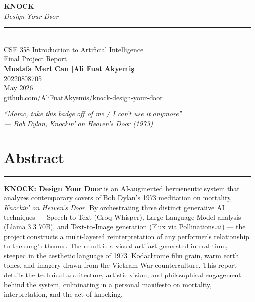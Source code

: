 \documentclass[12pt, a4paper]{article}
\begin{document}
\begin{titlepage}
    \centering
    \vspace*{3cm}

    {\Huge\bfseries\color{darkblue} KNOCK}\\[0.4em]
    {\large\itshape\color{rust} Design Your Door}\\[0.8em]
    \textcolor{gold}{\rule{\linewidth}{0.5pt}}\\[0.8em]
    {\small\color{midgray} CSE 358 Introduction to Artificial Intelligence}\\[0.2em]
    {\small\color{midgray} Final Project Report}\\[3cm]

    {\large\bfseries\color{darkblue} Mustafa Mert Can \quad|\quad Ali Fuat Akyemiş}\\[0.4em]
    {\small\color{midgray} 20220808705 \quad|}\\[0.6em]
    {\small\color{midgray} May 2026}\\[0.6em]
    {\small\ttfamily\color{rust}
        \href{https://github.com/AliFuatAkyemis/knock-design-your-door}%
             {github.com/AliFuatAkyemis/knock-design-your-door}}

    \vfill

    \begin{quotebox}
        \centering
        \itshape\color{rust}
        ``Mama, take this badge off of me / I can't use it anymore''\\[0.3em]
        \normalfont\small\color{midgray}
        --- Bob Dylan, \textit{Knockin' on Heaven's Door} (1973)
    \end{quotebox}
\end{titlepage}

\thispagestyle{empty}
\newpage

\section*{Abstract}
\textcolor{gold}{\rule{\linewidth}{0.5pt}}
\vspace{4pt}

\textbf{KNOCK: Design Your Door} is an AI-augmented hermeneutic system that analyzes
contemporary covers of Bob Dylan's 1973 meditation on mortality,
\textit{Knockin' on Heaven's Door.} By orchestrating three distinct generative AI
techniques --- Speech-to-Text (Groq Whisper), Large Language Model analysis
(Llama 3.3 70B), and Text-to-Image generation (Flux via Pollinations.ai) --- the
project constructs a multi-layered reinterpretation of any performer's relationship
to the song's themes. The result is a visual artifact generated in real time,
steeped in the aesthetic language of 1973: Kodachrome film grain, warm earth tones,
and imagery drawn from the Vietnam War counterculture. This report details the
technical architecture, artistic vision, and philosophical engagement behind the
system, culminating in a personal manifesto on mortality, interpretation, and the
act of knocking.
\end{document}
